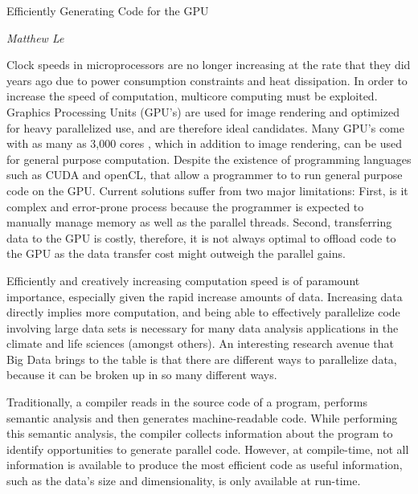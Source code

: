 \documentclass[a4paper,12pt]{article}
\begin{document}
\begin{center}
{\Large Efficiently Generating Code for the GPU}

\emph{Matthew Le}
\end{center}

Clock speeds in microprocessors are no longer increasing at the rate that they did years ago due to power consumption constraints and heat dissipation. In order to increase the speed of computation, multicore computing must be exploited. Graphics Processing Units (GPU's) are used for image rendering and optimized for heavy parallelized use, and are therefore ideal candidates. Many GPU's come with as many as 3,000 cores \cite{nvideaGPU}, which in addition to image rendering, can be used for general purpose computation. Despite the existence of programming languages such as CUDA and openCL, that allow a programmer to to run general purpose code on the GPU. Current solutions suffer from two major limitations: First, is it complex and error-prone process because the programmer is expected to manually manage memory as well as the parallel threads. Second, 
transferring data to the GPU is costly, therefore, it is not always optimal to offload code to the GPU as the data transfer cost might outweigh the parallel gains.

Efficiently and creatively increasing computation speed is of paramount importance, especially given the rapid increase amounts of data. Increasing data directly implies more computation, and being able to effectively parallelize code involving large data sets is necessary for many data analysis applications in the climate and life sciences (amongst others). An interesting research avenue that Big Data brings to the table is that there are  different ways to parallelize data, because it can be broken up in so many different ways.



Traditionally, a compiler reads in the source code of a program, performs semantic analysis and then generates machine-readable code. While performing this semantic analysis, the compiler collects information about the program to identify opportunities to generate parallel code. However, at compile-time, not all information is available to produce the most efficient code as useful information, such as the data's size and dimensionality, is only available at run-time.


\end{document}
